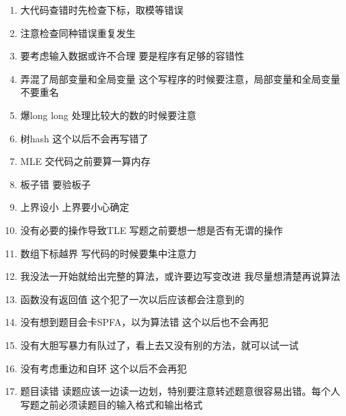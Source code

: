 \begin{enumerate}
	\item 大代码查错时先检查下标，取模等错误
	\item 注意检查同种错误重复发生
	\item 要考虑输入数据或许不合理 要是程序有足够的容错性
	\item 弄混了局部变量和全局变量 这个写程序的时候要注意，局部变量和全局变量不要重名
	\item 爆long long 处理比较大的数的时候要注意
	\item 树hash 这个以后不会再写错了
	\item MLE 交代码之前要算一算内存
	\item 板子错 要验板子
	\item 上界设小 上界要小心确定
	\item 没有必要的操作导致TLE 写题之前要想一想是否有无谓的操作
	\item 数组下标越界 写代码的时候要集中注意力
	\item 我没法一开始就给出完整的算法，或许要边写变改进 我尽量想清楚再说算法
	\item 函数没有返回值 这个犯了一次以后应该都会注意到的
	\item 没有想到题目会卡SPFA，以为算法错 这个以后也不会再犯
	\item 没有大胆写暴力有队过了，看上去又没有别的方法，就可以试一试
	\item 没有考虑重边和自环 这个以后不会再犯
	\item 题目读错 读题应该一边读一边划，特别要注意转述题意很容易出错。每个人写题之前必须读题目的输入格式和输出格式
\end{enumerate}
